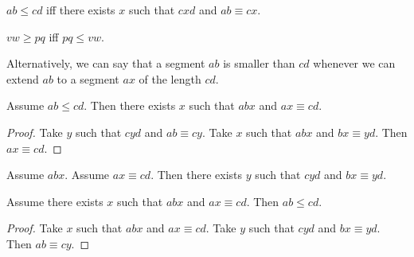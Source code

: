 \documentclass[10pt,a4paper,parskip=half,numbers=endperiod,headings=standardclasses,parskip]{scrartcl}
\newcommand{\Cong}[4]{#1 #2 \equiv #3 #4}
\newcommand{\Betw}[3]{#1 #2 #3}
\newcommand{\Leq}[4]{#1 #2 \leq #3 #4}
\newcommand{\Geq}[4]{#1 #2 \geq #3 #4}
\begin{document}
  \begin{forthel}
    \begin{definition} %
      $\Leq{a}{b}{c}{d}$ iff there exists $x$ such that $\Betw{c}{x}{d}$ and $\Cong{a}{b}{c}{x}$.
    \end{definition}

    \begin{definition} %
      $\Geq{v}{w}{p}{q}$ iff $\Leq{p}{q}{v}{w}$.
    \end{definition}
  \end{forthel}

  Alternatively, we can say that a segment $ab$ is smaller than $cd$ whenever we can extend $ab$
  to a segment $ax$ of the length $cd$.


  \begin{forthel}
    \begin{lemma} %
      Assume $\Leq{a}{b}{c}{d}$.
      Then there exists $x$ such that $\Betw{a}{b}{x}$ and $\Cong{a}{x}{c}{d}$.
    \end{lemma}
    \begin{proof}
        Take $y$ such that $\Betw{c}{y}{d}$ and $\Cong{a}{b}{c}{y}$.
        Take $x$ such that $\Betw{a}{b}{x}$ and $\Cong{b}{x}{y}{d}$.
        Then $\Cong{a}{x}{c}{d}$.
    \end{proof}

    \begin{axiom} %
      Assume $\Betw{a}{b}{x}$.
      Assume $\Cong{a}{x}{c}{d}$.
      Then there exists $y$ such that $\Betw{c}{y}{d}$ and $\Cong{b}{x}{y}{d}$.
    \end{axiom}

    \begin{lemma} %
      Assume there exists $x$ such that $\Betw{a}{b}{x}$ and $\Cong{a}{x}{c}{d}$.
      Then $\Leq{a}{b}{c}{d}$.
    \end{lemma}
    \begin{proof}
      Take $x$ such that $\Betw{a}{b}{x}$ and $\Cong{a}{x}{c}{d}$.
      Take $y$ such that $\Betw{c}{y}{d}$ and $\Cong{b}{x}{y}{d}$.
      Then $\Cong{a}{b}{c}{y}$.
    \end{proof}
  \end{forthel}
\end{document}
